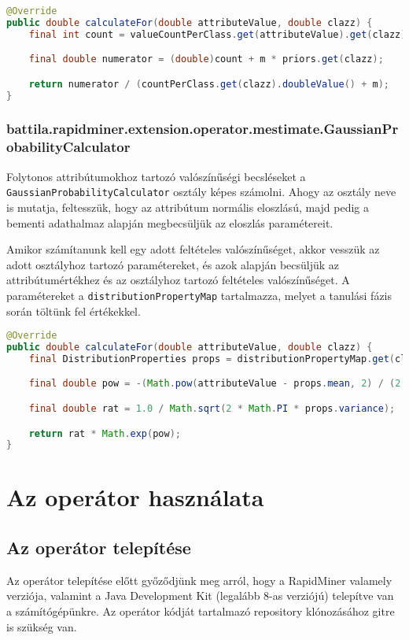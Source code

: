\documentclass[a4paper]{article}
\begin{document}
\begin{lstlisting}[language=Java, caption={Nominális attribútum feltételes valószínűségének kiszámítása.}, captionpos=b, escapechar=$]
@Override
public double calculateFor(double attributeValue, double clazz) {
    final int count = valueCountPerClass.get(attributeValue).get(clazz);

    final double numerator = (double)count + m * priors.get(clazz);

    return numerator / (countPerClass.get(clazz).doubleValue() + m);
}
\end{lstlisting}

\subsubsection{battila.rapidminer.extension.operator.mestimate.GaussianProbabilityCalculator}

Folytonos attribútumokhoz tartozó valószínűségi becsléseket a \texttt{GaussianProbabilityCalculator} osztály képes számolni. Ahogy az osztály neve is mutatja, feltesszük, hogy az attribútum normális eloszlású, majd pedig a bementi adathalmaz alapján megbecsüljük az eloszlás paramétereit.

Amikor számítanunk kell egy adott feltételes valószínűséget, akkor vesszük az adott osztályhoz tartozó paramétereket, és azok alapján becsüljük az attribútumértékhez és az osztályhoz tartozó feltételes valószínűséget. A paramétereket a \texttt{distributionPropertyMap} tartalmazza, melyet a tanulási fázis során töltünk fel értékekkel.

\begin{lstlisting}[language=Java, caption={Nominális attribútum feltételes valószínűségének kiszámítása.}, captionpos=b, escapechar=$]
@Override
public double calculateFor(double attributeValue, double clazz) {
    final DistributionProperties props = distributionPropertyMap.get(clazz);

    final double pow = -(Math.pow(attributeValue - props.mean, 2) / (2 * props.variance));

    final double rat = 1.0 / Math.sqrt(2 * Math.PI * props.variance);

    return rat * Math.exp(pow);
}
\end{lstlisting}

\section{Az operátor használata}
\subsection{Az operátor telepítése}
Az operátor telepítése előtt győződjünk meg arról, hogy a RapidMiner valamely verziója, valamint a Java Development Kit (legalább 8-as verziójú) telepítve van a számítógépünkre. Az operátor kódját tartalmazó repository klónozásához gitre is szükség van.
\end{document}
